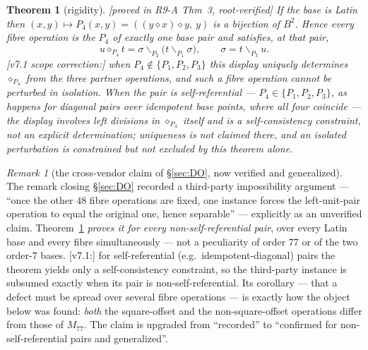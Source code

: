 \documentclass[11pt]{article}
\theoremstyle{plain}
\newtheorem{theorem}{Theorem}[section]
\theoremstyle{definition}
\theoremstyle{remark}
\newtheorem*{remark*}{Remark}
\numberwithin{equation}{section}
\newcommand{\statusbox}[1]{{\small\sloppy\textsf{[#1]}}}
\newcommand{\PROVED}[1]{\statusbox{proved in #1, root-verified}}
\begin{document}
\begin{theorem}[rigidity]\label{thm:rigidity}
\PROVED{R9-A Thm~3}
If the base is Latin then $(x,y)\mapsto P_4(x,y) = ((y\diamond x)\diamond y,\ y)$
is a \emph{bijection} of $B^2$. Hence every fibre operation is the $P_4$ of exactly
one base pair and satisfies, at that pair,
\[
  u\diamond_{P_4}t = \sigma\backslash_{P_2}\bigl(t\backslash_{P_1}\sigma\bigr),
  \qquad \sigma = t\backslash_{P_3}u .
\]
[v7.1 scope correction:] when $P_4\notin\{P_1,P_2,P_3\}$ this display
\emph{uniquely determines} $\diamond_{P_4}$ from the three partner operations,
and such a fibre operation cannot be perturbed in isolation. When the pair is
\emph{self-referential} --- $P_4\in\{P_1,P_2,P_3\}$, as happens for diagonal
pairs over idempotent base points, where all four coincide --- the display
involves left divisions in $\diamond_{P_4}$ itself and is a \emph{self-consistency
constraint}, not an explicit determination; uniqueness is \emph{not} claimed
there, and an isolated perturbation is constrained but not excluded by this
theorem alone.
\end{theorem}

\begin{remark*}[the cross-vendor claim of \S\ref{sec:DO}, now verified and generalized]
The remark closing \S\ref{sec:DO} recorded a third-party impossibility argument
\cite{R6gpt} --- ``once the other $48$ fibre operations are fixed, one instance
forces the left-unit-pair operation to equal the original one, hence separable''
--- explicitly as an unverified claim. Theorem~\ref{thm:rigidity} \emph{proves
it for every non-self-referential pair}, over every Latin base and every fibre
simultaneously --- not a peculiarity of order $77$ or of the two order-$7$ bases.
[v7.1:] for self-referential (e.g.\ idempotent-diagonal) pairs the theorem yields
only a self-consistency constraint, so the third-party instance is subsumed
exactly when its pair is non-self-referential. Its corollary --- that a defect
must be spread over several fibre operations --- is exactly how the object below
was found: \emph{both} the square-offset and the non-square-offset operations
differ from those of $M_{77}$. The claim is upgraded from ``recorded'' to
``confirmed for non-self-referential pairs and generalized''.
\end{remark*}
\end{document}

